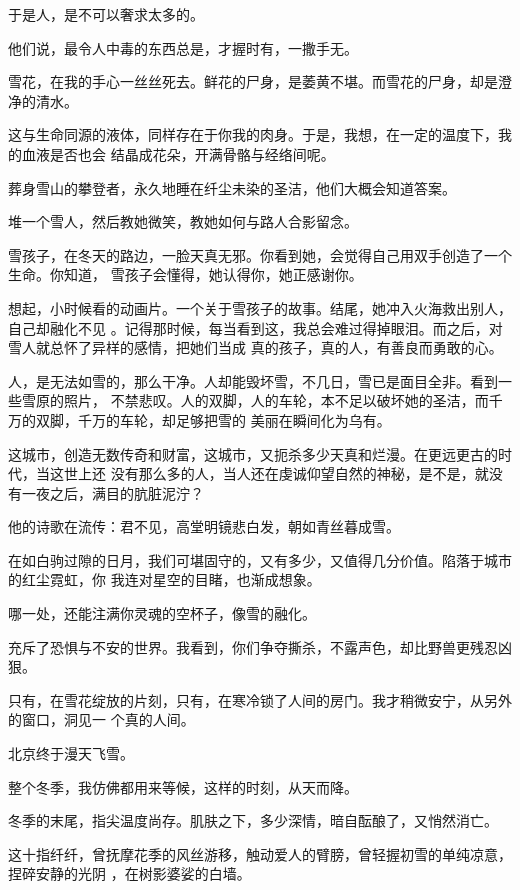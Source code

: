 \documentclass[12pt,a4paper]{article}
\begin{document}
		于是人，是不可以奢求太多的。\par
		他们说，最令人中毒的东西总是，才握时有，一撒手无。

		雪花，在我的手心一丝丝死去。鲜花的尸身，是萎黄不堪。而雪花的尸身，却是澄净的清水。

		这与生命同源的液体，同样存在于你我的肉身。于是，我想，在一定的温度下，我的血液是否也会
	结晶成花朵，开满骨骼与经络间呢。

		葬身雪山的攀登者，永久地睡在纤尘未染的圣洁，他们大概会知道答案。

		堆一个雪人，然后教她微笑，教她如何与路人合影留念。

		雪孩子，在冬天的路边，一脸天真无邪。你看到她，会觉得自己用双手创造了一个生命。你知道，
	雪孩子会懂得，她认得你，她正感谢你。

		想起，小时候看的动画片。一个关于雪孩子的故事。结尾，她冲入火海救出别人，自己却融化不见
	。记得那时候，每当看到这，我总会难过得掉眼泪。而之后，对雪人就总怀了异样的感情，把她们当成
	真的孩子，真的人，有善良而勇敢的心。

		人，是无法如雪的，那么干净。人却能毁坏雪，不几日，雪已是面目全非。看到一些雪原的照片，
	不禁悲叹。人的双脚，人的车轮，本不足以破坏她的圣洁，而千万的双脚，千万的车轮，却足够把雪的
	美丽在瞬间化为乌有。

		这城市，创造无数传奇和财富，这城市，又扼杀多少天真和烂漫。在更远更古的时代，当这世上还
	没有那么多的人，当人还在虔诚仰望自然的神秘，是不是，就没有一夜之后，满目的肮脏泥泞？

		他的诗歌在流传：君不见，高堂明镜悲白发，朝如青丝暮成雪。

		在如白驹过隙的日月，我们可堪固守的，又有多少，又值得几分价值。陷落于城市的红尘霓虹，你
	我连对星空的目睹，也渐成想象。

		哪一处，还能注满你灵魂的空杯子，像雪的融化。

		充斥了恐惧与不安的世界。我看到，你们争夺撕杀，不露声色，却比野兽更残忍凶狠。

		只有，在雪花绽放的片刻，只有，在寒冷锁了人间的房门。我才稍微安宁，从另外的窗口，洞见一
	个真的人间。

		北京终于漫天飞雪。

		整个冬季，我仿佛都用来等候，这样的时刻，从天而降。

	\endwriting




		冬季的末尾，指尖温度尚存。肌肤之下，多少深情，暗自酝酿了，又悄然消亡。

		这十指纤纤，曾抚摩花季的风丝游移，触动爱人的臂膀，曾轻握初雪的单纯凉意，捏碎安静的光阴
	，在树影婆娑的白墙。
\end{document}
